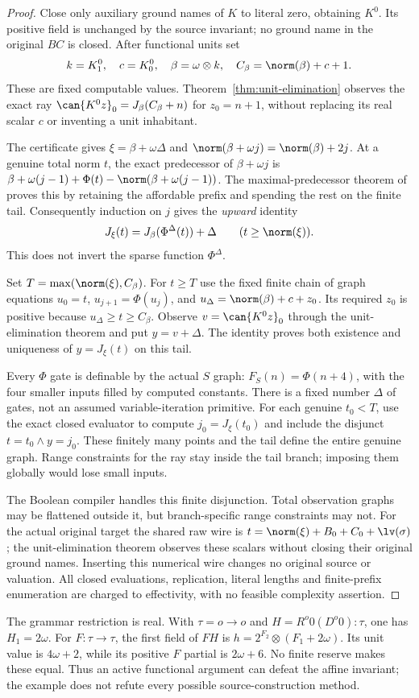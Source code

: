 \begin{proof}
Close only auxiliary ground names of $K$ to literal zero, obtaining $K^0$.
Its positive field is unchanged by the source invariant; no ground name in
the original $BC$ is closed.  After functional units set
\[
 k=K^0_1,\quad c=K^0_0,\quad\beta=\omega\otimes k,\quad
 C_\beta=\norm(\beta)+c+1.
\]
These are fixed computable values.  Theorem~\ref{thm:unit-elimination}
observes the exact ray $\can{K^0z}_0=J_\beta(C_\beta+n)$ for $z_0=n+1$,
without replacing its real scalar $c$ or inventing a unit inhabitant.

The certificate gives $\xi=\beta+\omega\Delta$ and
$\norm(\beta+\omega j)=\norm(\beta)+2j$.  At a genuine total norm $t$,
the exact predecessor of $\beta+\omega j$ is
$\beta+\omega(j-1)+\Phi(t)-\norm(\beta+\omega(j-1))$.
The maximal-predecessor theorem of \cite{wwfoundations} proves this by
retaining the affordable prefix and spending the rest on the finite tail.
Consequently induction on $j$ gives the \emph{upward} identity
\[
 J_\xi(t)=J_\beta(\Phi^\Delta(t))+\Delta
          \qquad(t\ge\norm(\xi)).
\]
This does not invert the sparse function $\Phi^\Delta$.

Set $T=\max(\norm(\xi),C_\beta)$.  For $t\ge T$ use the fixed finite
chain of graph equations $u_0=t$, $u_{j+1}=\Phi(u_j)$, and
$u_\Delta=\norm(\beta)+c+z_0$.  Its required $z_0$ is positive because
$u_\Delta\ge t\ge C_\beta$.  Observe $v=\can{K^0z}_0$ through the
unit-elimination theorem and put $y=v+\Delta$.  The identity proves both
existence and uniqueness of $y=J_\xi(t)$ on this tail.

Every $\Phi$ gate is definable by the actual $S$ graph:
$F_S(n)=\Phi(n+4)$, with the four smaller inputs filled by computed
constants.  There is a fixed number $\Delta$ of gates, not an assumed
variable-iteration primitive.  For each genuine $t_0<T$, use the exact
closed evaluator to compute $j_0=J_\xi(t_0)$ and include the disjunct
$t=t_0\wedge y=j_0$.  These finitely many points and the tail define
the entire genuine graph.  Range constraints for the ray stay inside
the tail branch; imposing them globally would lose small inputs.

The Boolean compiler handles this finite disjunction.  Total observation
graphs may be flattened outside it, but branch-specific range constraints
may not.  For the actual original target the shared raw wire is
$t=\norm(\xi)+B_0+C_0+\lv(\sigma)$; the unit-elimination theorem observes
these scalars without closing their original ground names.  Inserting this
numerical wire changes no original source or valuation.  All closed
evaluations, replication, literal lengths and finite-prefix enumeration
are charged to effectivity, with no feasible complexity assertion.
\end{proof}

The grammar restriction is real.  With $\tau=o\to o$ and
$H=R^o0(D^o0):\tau$, one has $H_1=2\omega$.  For $F:\tau\to\tau$,
the first field of $FH$ is $h=2^{F_2}\otimes(F_1+2\omega)$.
Its unit value is $4\omega+2$, while its positive $F$ partial is
$2\omega+6$.  No finite reserve makes these equal.  Thus an active
functional argument can defeat the affine invariant; the example does
not refute every possible source-construction method.
